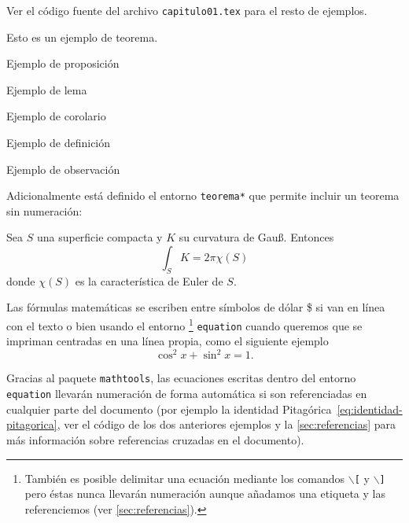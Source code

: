 Ver el código fuente del archivo \texttt{capitulo01.tex} para el resto de ejemplos.

\begin{teorema}\label{thm:teorema}
Esto es un ejemplo de teorema.
\end{teorema}

\begin{proposicion}
Ejemplo de proposición
\end{proposicion}

\begin{lema}
Ejemplo de lema
\end{lema}

\begin{corolario}
Ejemplo de corolario
\end{corolario}

\begin{definicion}
Ejemplo de definición
\end{definicion}

\begin{observacion}
Ejemplo de observación
\end{observacion}

Adicionalmente está definido el entorno \texttt{teorema*} que permite incluir un teorema sin numeración:

\begin{teorema*}
  Sea $S$ una superficie compacta y $K$ su curvatura de Gauß. Entonces
\begin{equation}
  \int_S K = 2\pi\chi(S)
\end{equation}
donde $\chi(S)$ es la característica de Euler de $S$.
\end{teorema*}

Las fórmulas matemáticas se escriben entre símbolos de dólar \$ si van en línea con el texto o bien usando el entorno%
\footnote{
  También es posible delimitar una ecuación mediante los comandos \texttt{$\backslash$[} y \texttt{$\backslash$]} pero éstas nunca llevarán numeración aunque añadamos una etiqueta y las referenciemos (ver \autoref{sec:referencias}).
} 
\texttt{equation} cuando queremos que se impriman centradas en una línea propia, como el siguiente ejemplo
\begin{equation}\label{eq:identidad-pitagorica}
  \cos^2 x + \sin^2 x = 1.
\end{equation}


Gracias al paquete \texttt{mathtools}, las ecuaciones escritas dentro del entorno \texttt{equation} llevarán numeración de forma automática si son referenciadas  en cualquier parte del documento (por ejemplo la identidad Pitagórica~\eqref{eq:identidad-pitagorica}, ver el código de los dos anteriores ejemplos y la \autoref{sec:referencias} para más información sobre referencias cruzadas en el documento).




